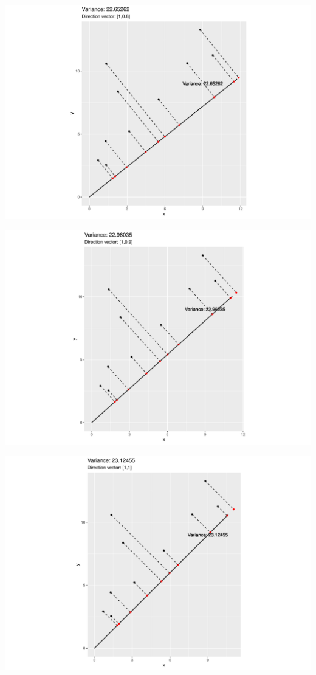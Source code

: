 \documentclass[
  ignorenonframetext,
]{beamer}
\begin{document}
\begin{frame}{}
\protect\hypertarget{section-8}{}
\includegraphics{note9_files/figure-beamer/unnamed-chunk-15-1.pdf}
\end{frame}

\begin{frame}{}
\protect\hypertarget{section-9}{}
\includegraphics{note9_files/figure-beamer/unnamed-chunk-16-1.pdf}
\end{frame}

\begin{frame}{}
\protect\hypertarget{section-10}{}
\includegraphics{note9_files/figure-beamer/unnamed-chunk-17-1.pdf}
\end{frame}
\end{document}
